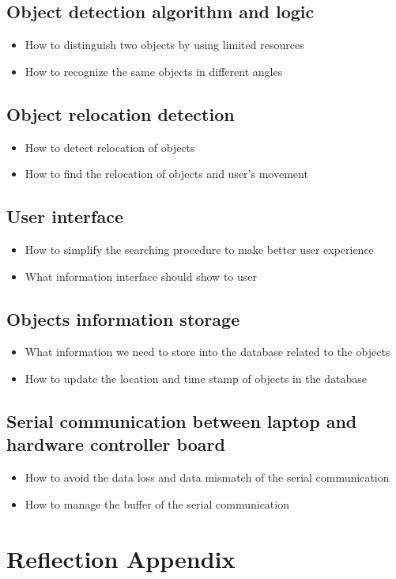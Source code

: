 \documentclass{article}
\begin{document}
\begin{large}
\subsection{Object detection algorithm and logic}
\begin{itemize}
\item{How to distinguish two objects by using limited resources}
\item{How to recognize the same objects in different angles}
\end{itemize}


\subsection{Object relocation detection}
\begin{itemize}
\item{How to detect relocation of objects}
\item{How to find the relocation of objects and user's movement}
\end{itemize}

\subsection{User interface}
\begin{itemize}
\item{How to simplify the searching procedure to make better user experience}
\item{What information interface should show to user}
\end{itemize}

\subsection{Objects information storage}
\begin{itemize}
\item{What information we need to store into the database related to the objects}
\item{How to update the location and time stamp of objects in the database}
\end{itemize}



\subsection{Serial communication between laptop and hardware controller board}
\begin{itemize}
\item{How to avoid the data loss and data mismatch of the serial communication}
\item{How to manage the buffer of the serial communication}

\end{itemize}





\appendix
\section{Reflection Appendix}





\end{large}
\end{document}
